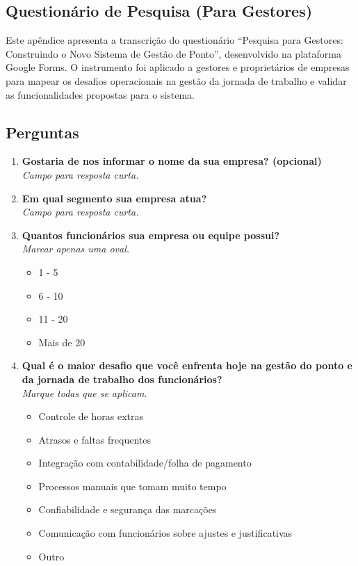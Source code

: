
\begin{apendicesenv}
\chapter{Questionário de Pesquisa (Para Gestores)}
\label{apendice:pesquisa-gestores}

Este apêndice apresenta a transcrição do questionário ``Pesquisa para Gestores: Construindo o Novo Sistema de Gestão de Ponto'', desenvolvido na plataforma Google Forms. O instrumento foi aplicado a gestores e proprietários de empresas para mapear os desafios operacionais na gestão da jornada de trabalho e validar as funcionalidades propostas para o sistema.

\section*{Perguntas}
\begin{enumerate}
  \item \textbf{Gostaria de nos informar o nome da sua empresa? (opcional)} \\
        \textit{Campo para resposta curta.}

  \item \textbf{Em qual segmento sua empresa atua?} \\
        \textit{Campo para resposta curta.}

  \item \textbf{Quantos funcionários sua empresa ou equipe possui?} \\
        \textit{Marcar apenas uma oval.}
        \begin{itemize}
          \item 1 - 5
          \item 6 - 10
          \item 11 - 20
          \item Mais de 20
        \end{itemize}

  \item \textbf{Qual é o maior desafio que você enfrenta hoje na gestão do ponto e da jornada de trabalho dos funcionários?} \\
        \textit{Marque todas que se aplicam.}
        \begin{itemize}
          \item Controle de horas extras
          \item Atrasos e faltas frequentes
          \item Integração com contabilidade/folha de pagamento
          \item Processos manuais que tomam muito tempo
          \item Confiabilidade e segurança das marcações
          \item Comunicação com funcionários sobre ajustes e justificativas
          \item Outro
        \end{itemize}


\end{enumerate}
\end{apendicesenv}
